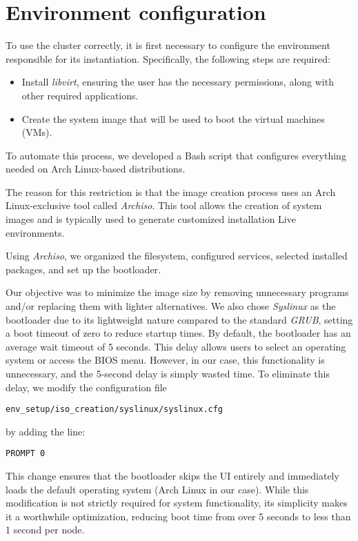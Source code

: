 \section{Environment configuration}
To use the cluster correctly, it is first necessary to configure the 
environment responsible for its instantiation. Specifically, the following
steps are required:
\begin{itemize}
	\item Install \textit{libvirt}, ensuring the user has the necessary permissions,
    along with other required applications.
	\item Create the system image that will be used to boot the virtual
    machines (VMs).
\end{itemize}
To automate this process, we developed a Bash script that configures 
everything needed on Arch Linux-based distributions.

The reason for this restriction is that the image creation process uses 
an Arch Linux-exclusive tool called \textit{Archiso}\cite{4}. 
This tool allows the creation of system images and is typically used 
to generate customized installation Live environments.

Using \textit{Archiso}, we organized the filesystem, configured services, selected 
installed packages, and set up the bootloader.

Our objective was to minimize the image size by removing unnecessary programs 
and/or replacing them with lighter alternatives. We also chose \textit{Syslinux} 
as the bootloader due to its lightweight nature compared to the standard 
\textit{GRUB}, setting a boot timeout of zero to reduce startup times. By default, the bootloader has an average wait timeout of 5 seconds.
This delay allows users to select an operating system or access the BIOS menu.
However, in our case, this functionality is unnecessary, and the 5-second delay is 
simply wasted time.
To eliminate this delay, we modify the configuration file 
\begin{verbatim}
env_setup/iso_creation/syslinux/syslinux.cfg
\end{verbatim}
by adding the line:
\begin{verbatim}
PROMPT 0
\end{verbatim}
This change ensures that the bootloader skips the UI entirely and immediately loads the default 
operating system (Arch Linux in our case).
While this modification is not strictly required for system functionality, 
its simplicity makes it a worthwhile optimization, reducing boot time from over 5 seconds to 
less than 1 second per node.


